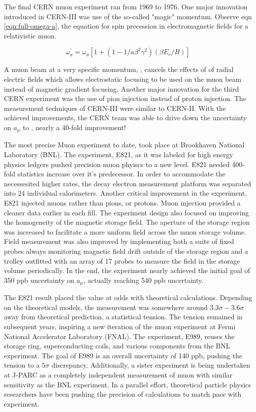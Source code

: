 The final CERN muon \gmtwo experiment ran from 1969 to 1976.  One major innovation introduced in CERN-III was use of the so-called "magic" momentum. Observe eqn \ref{eqn:full-omega-a}, the equation for spin precession in electromagnetic fields for a relativistic muon.

\begin{equation}
\omega^\prime_a = \omega_a[1 + (1 - 1 / a \beta^2 \gamma^2)(\beta E_r / B)]
\label{eqn:full-omega-a}
\end{equation}

A muon beam at a very specific momentum, , cancels the effects of of radial electric fields which allows electrostatic focusing to be used on the muon beam instead of magnetic gradient focusing.  Another major innovation for the third CERN experiment was the use of pion injection instead of proton injection.  The measurement techniques of CERN-III were similar to CERN-II.  With the achieved improvements, the CERN team was able to drive down the uncertainty on $a_\mu$ to , nearly a 40-fold improvement!

The most precise Muon \gmtwo experiment to date, took place at Brookhaven National Laboratory (BNL). The experiment, E821, as it was labeled for high energy physics ledgers pushed precision muon phyiscs to a new level.  E821 needed 400-fold statistics increase over it's predecessor.  In order to accommodate the necessesited higher rates, the decay electron measurement platform was separated into 24 individual calorimeters.  Another critical improvement in the experiment, E821 injected muons rather than pions, or protons.  Muon injection provided a cleaner data earlier in each fill.  The experiment design also focused on improving the homogeneity of the magnetic storage field.  The aperture of the storage region was increased to facilitate a more uniform field across the muon storage volume.  Field measurement was also improved by implementing both a suite of fixed probes always monitoring magnetic field drift outside of the storage region and a trolley outfitted with an array of 17 probes to measure the field in the storage volume periodically.  In the end, the experiment nearly achieved the initial goal of 350 ppb uncertainty on $a_\mu$, actually reaching 540 ppb uncertainty.

The E821 \gmtwo result placed the value at odds with theoretical calculations.  Depending on the theoretical models, the measurement was somewhere around $3.3\sigma - 3.6\sigma$ away from theoretical prediction, a statistical tension.  The tension remained in subsequent years, inspiring a new iteration of the muon \gmtwo experiment at Fermi National Accelerator Laboratory (FNAL). The experiment, E989, reuses the storage ring, superconducting coils, and various components from the BNL experiment.  The goal of E989 is an overall uncertainty of 140 ppb, pushing the tension to a $5\sigma$ discrepancy. Additionally, a sister experiment is being undertaken at J-PARC as a completely independent measurement of muon \gmtwo with similar sensitivity as the BNL experiment.  In a parallel effort, theoretical particle physics researchers have been pushing the precision of calculations to match pace with experiment.


